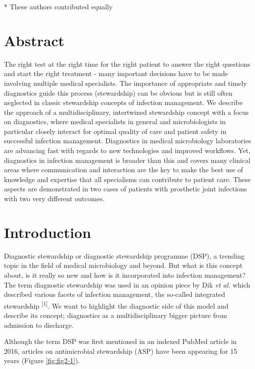 \documentclass[
]{book}
\begin{document}
* These authors contributed equally

\hypertarget{abstract}{%
\section*{Abstract}\label{abstract}}

The right test at the right time for the right patient to answer the right questions and start the right treatment - many important decisions have to be made involving multiple medical specialists. The importance of appropriate and timely diagnostics guide this process (stewardship) can be obvious but is still often neglected in classic stewardship concepts of infection management. We describe the approach of a multidisciplinary, intertwined stewardship concept with a focus on diagnostics, where medical specialists in general and microbiologists in particular closely interact for optimal quality of care and patient safety in successful infection management. Diagnostics in medical microbiology laboratories are advancing fast with regards to new technologies and improved workflows. Yet, diagnostics in infection management is broader than this and covers many clinical areas where communication and interaction are the key to make the best use of knowledge and expertise that all specialisms can contribute to patient care. These aspects are demonstrated in two cases of patients with prosthetic joint infections with two very different outcomes.

\hypertarget{introduction-1}{%
\section{Introduction}\label{introduction-1}}

Diagnostic stewardship or diagnostic stewardship programme (DSP), a trending topic in the field of medical microbiology and beyond. But what is this concept about, is it really so new and how is it incorporated into infection management? The term diagnostic stewardship was used in an opinion piece by Dik \emph{et al.} which described various facets of infection management, the so-called integrated stewardship \textsuperscript{{[}1{]}}. We want to highlight the diagnostic side of this model and describe its concept; diagnostics as a multidisciplinary bigger picture from admission to discharge.

Although the term DSP was first mentioned in an indexed PubMed article in 2016, articles on antimicrobial stewardship (ASP) have been appearing for 15 years (Figure \ref{fig:fig2-1}).
\end{document}
